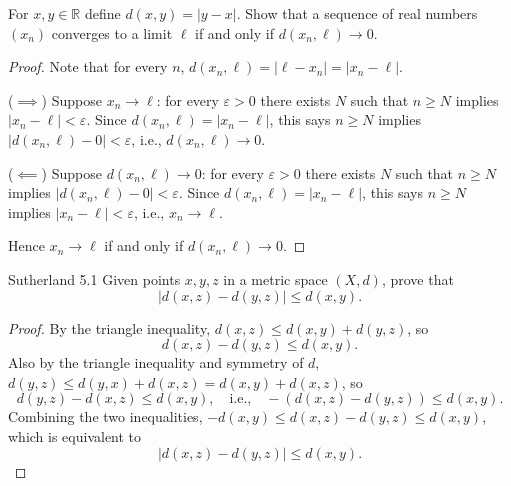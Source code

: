 \documentclass[minion]{homework}
\newcommand{\Reals}{\ensuremath{\mathbb R}}%
\begin{document}
\begin{problems}
\problem For $x,y\in \Reals$ define $d(x,y) = |y-x|$.
Show that a sequence of real numbers $(x_n)$ converges to
a limit $\ell$ if and only if $d(x_n, \ell)\to 0$.
\newline
\begin{proof}
  Note that for every $n$, $d(x_n,\ell) = |\ell - x_n| = |x_n - \ell|$.

  ($\implies$) Suppose $x_n\to\ell$: for every $\varepsilon>0$ there exists $N$ such that $n\ge N$ implies $|x_n-\ell|<\varepsilon$. Since $d(x_n,\ell) = |x_n-\ell|$, this says $n\ge N$ implies $|d(x_n,\ell) - 0| < \varepsilon$, i.e., $d(x_n,\ell)\to0$.

  ($\impliedby$) Suppose $d(x_n,\ell)\to0$: for every $\varepsilon>0$ there exists $N$ such that $n\ge N$ implies $|d(x_n,\ell)-0|<\varepsilon$. Since $d(x_n,\ell) = |x_n-\ell|$, this says $n\ge N$ implies $|x_n-\ell|<\varepsilon$, i.e., $x_n\to\ell$.

  Hence $x_n\to\ell$ if and only if $d(x_n,\ell)\to0$.
\end{proof}

\problem Sutherland 5.1
Given points $x,y,z$ in a metric space $(X,d)$, prove that
\[
|d(x,z) - d(y,z)| \le d(x,y).
\]
\begin{proof}
  By the triangle inequality, $d(x,z) \le d(x,y) + d(y,z)$, so
  $$d(x,z) - d(y,z) \le d(x,y).$$
  Also by the triangle inequality and symmetry of $d$, $d(y,z) \le d(y,x)+d(x,z) = d(x,y)+d(x,z)$, so
  $$d(y,z) - d(x,z) \le d(x,y), \quad\text{i.e.,}\quad -(d(x,z)-d(y,z)) \le d(x,y).$$
  Combining the two inequalities, $-d(x,y) \le d(x,z)-d(y,z) \le d(x,y)$, which is equivalent to
  $$|d(x,z)-d(y,z)| \le d(x,y).$$
\end{proof}


\end{problems}
\end{document}
